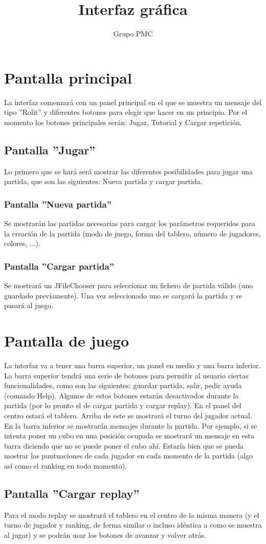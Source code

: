 \documentclass[14pt]{extreport}
\author{Grupo PMC}
\begin{document}
\title{Interfaz gráfica}
\maketitle


\section*{Pantalla principal}
La interfaz comenzará con un panel principal en el que se muestra un mensaje del tipo ''Rolit'' y diferentes botones para elegir que hacer en un principio. Por el momento los botones principales serán: Jugar, Tutorial y Cargar repetición.

\subsection*{Pantalla ''Jugar''}
Lo primero que se hará será mostrar las diferentes posibilidades para jugar una partida, que son las siguientes: Nueva partida y cargar partida.

\subsubsection*{Pantalla ''Nueva partida''}
Se mostrarán las partidas necesarias para cargar los parámetros requeridos para la creación de la partida (modo de juego, forma del tablero, número de jugadores, colores, ...).

\subsubsection*{Pantalla ''Cargar partida''}
Se mostrará un JFileChooser para seleccionar un fichero de partida válido (uno guardado previamente). Una vez seleccionado uno se cargará la partida y se pasará al juego.

\section*{Pantalla de juego}
La interfaz va a tener una barra superior, un panel en medio y una barra inferior.
La barra superior tendrá una serie de botones para permitir al usuario ciertas funcionalidades, como son las siguientes: guardar partida, salir, pedir ayuda (comando Help). Algunos de estos botones estarán desactivados durante la partida (por lo pronto el de cargar partida y cargar replay).
En el panel del centro estará el tablero. Arriba de este se mostrará el turno del jugador actual.
En la barra inferior se mostrarán mensajes durante la partida. Por ejemplo, si se intenta poner un cubo en una posición ocupada se mostrará un mensaje en esta barra diciendo que no se puede poner el cubo ahí.
Estaría bien que se pueda mostrar las puntuaciones de cada jugador en cada momento de la partida (algo así como el ranking en todo momento).

\subsection*{Pantalla ''Cargar replay''}
Para el modo replay se mostrará el tablero en el centro de la misma manera (y el turno de jugador y ranking, de forma similar o incluso idéntica a como se muestra al jugar) y se podrán usar los botones de avanzar y volver atrás.
\end{document}
